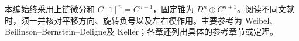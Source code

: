 \ProseParagraphBreak
本编始终采用上链微分和 \(C[1]^n=C^{n+1}\)，固定锥为 \(D^n\oplus C^{n+1}\)。阅读不同文献时，须一并核对平移方向、旋转负号以及左右模作用。主要参考为 Weibel\cite[Sections 10.1--10.8]{Weibel1994HomologicalAlgebra}、Beilinson--Bernstein--Deligne\cite[Section 1.3]{BBD1982FaisceauxPervers}及 Keller\cite[Sections 3.1 and 4]{Keller1998AbelianDerived}\cite[Sections 5.3, 8--9]{Keller1994DerivingDG}；各章还列出具体的参考章节或定理。






